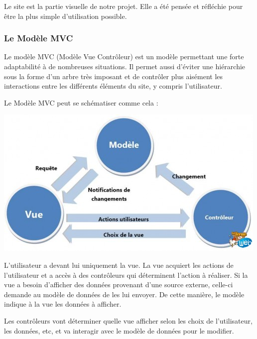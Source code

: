\documentclass[12pt,a4paper]{article}
\begin{document}
\begin{large}
\begin{onehalfspace}Le site est la partie visuelle de notre projet. Elle a été pensée et réfléchie pour être la plus simple d’utilisation possible.
\end{onehalfspace}
\end{large}

\subsubsection*{Le Modèle MVC}

\begin{large}
\begin{onehalfspace}Le modèle MVC (Modèle Vue Contrôleur) est un modèle permettant une forte adaptabilité à de nombreuses situations. Il permet aussi d’éviter une hiérarchie sous la forme d’un arbre très imposant et de contrôler plus aisément les interactions entre les différents éléments du site, y compris l’utilisateur.

    Le Modèle MVC peut se schématiser comme cela :

      \includegraphics[scale=0.5]{figure6(3_1).png}


    L’utilisateur a devant lui uniquement la vue. La vue acquiert les actions de l’utilisateur et a accès à des contrôleurs qui déterminent l’action à réaliser. Si la vue a besoin d’afficher des données provenant d’une source externe, celle-ci demande au modèle de données de les lui envoyer. De cette manière, le modèle indique à la vue les données à afficher.

    Les contrôleurs vont déterminer quelle vue afficher selon les choix de l’utilisateur, les données, etc, et va interagir avec le modèle de données pour le modifier.
\end{onehalfspace}
\end{large}
\end{document}
